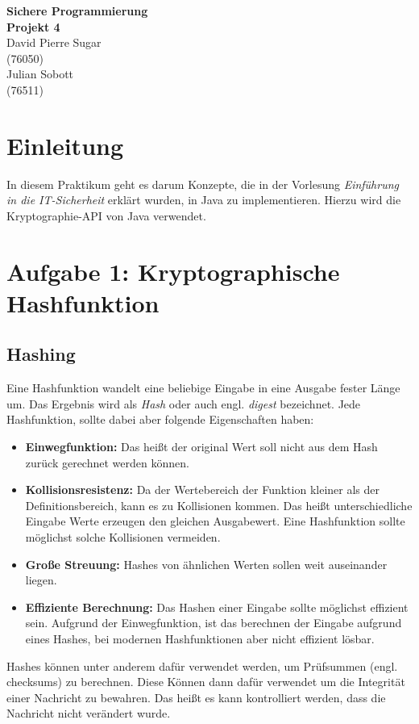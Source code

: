 \documentclass[12pt]{article}
\begin{document}
\begin{center}
  \textbf{\LARGE Sichere Programmierung} \\[1ex]%
  \textbf{\Large Projekt 4}\\[2ex] %
  David Pierre Sugar\\ %
  (76050) \\ %
  Julian Sobott\\ %
  (76511) \\ %
  
\end{center}

\tableofcontents

\section{Einleitung}
In diesem Praktikum geht es darum Konzepte, die in der Vorlesung \textit{Einführung in die IT-Sicherheit} erklärt wurden, in Java zu implementieren. Hierzu wird die Kryptographie-API von Java verwendet.

\section{Aufgabe 1: Kryptographische Hashfunktion}

\subsection{Hashing}

Eine Hashfunktion wandelt eine beliebige Eingabe in eine Ausgabe fester Länge um. Das Ergebnis wird als \textit{Hash} oder auch  engl. \textit{digest} bezeichnet.
Jede Hashfunktion, sollte dabei aber folgende Eigenschaften haben:
\begin{itemize}
\item \textbf{Einwegfunktion:} Das heißt der original Wert soll nicht aus dem Hash zurück gerechnet werden können.
\item \textbf{Kollisionsresistenz:} Da der Wertebereich der Funktion kleiner als der Definitionsbereich, kann es zu Kollisionen kommen. Das heißt unterschiedliche Eingabe Werte erzeugen den gleichen Ausgabewert. Eine Hashfunktion sollte möglichst solche Kollisionen vermeiden.
\item \textbf{Große Streuung:} Hashes von ähnlichen Werten sollen weit auseinander liegen. 
\item \textbf{Effiziente Berechnung:} Das Hashen einer Eingabe sollte möglichst effizient sein. Aufgrund der Einwegfunktion, ist das berechnen der Eingabe aufgrund eines Hashes, bei modernen Hashfunktionen aber nicht effizient lösbar.
\end{itemize}
Hashes können unter anderem dafür verwendet werden, um Prüfsummen (engl. checksums) zu berechnen. 
Diese Können dann dafür verwendet um die Integrität einer Nachricht zu bewahren. Das heißt es kann kontrolliert werden, dass die Nachricht nicht verändert wurde.
\end{document}
